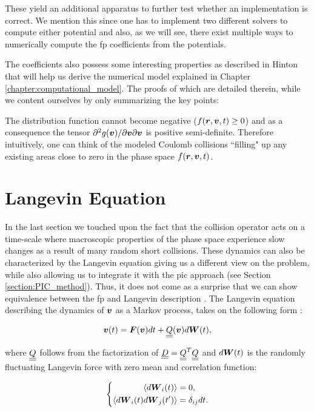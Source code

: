 These yield an additional apparatus to further test whether an implementation is correct. We mention
this since one has to implement two different solvers to compute either potential and also, as we will
see, there exist multiple ways to numerically compute the \gls{fp} coefficients from the potentials.

The coefficients also possess some interesting properties as described in Hinton
\cite{hinton1983collisional} that will help us derive the numerical model explained in Chapter
\ref{chapter:computational_model}. The proofs of which are detailed therein, while we content 
ourselves by only summarizing the key points:

The distribution function cannot become negative ($f(\boldsymbol{r}, \boldsymbol{v}, t) \ge 0$) and as a
consequence the tensor $\partial^2 g(\boldsymbol{v})/ \partial \boldsymbol{v} \partial \boldsymbol{v}$ is positive
semi-definite.
Therefore intuitively, one can think of the modeled Coulomb collisions ``filling" up any existing
areas close to zero in the phase space $f(\boldsymbol{r}, \boldsymbol{v}, t)$.


\section{Langevin Equation}
\label{section:langevin}

In the last section we touched upon the fact that the collision operator acts on a time-scale
where macroscopic properties of the phase space experience slow changes as a result of many random short
collisions.
These dynamics can also be characterized by the Langevin equation giving us a different view on the
problem, while also allowing us to integrate it with the \gls{pic} approach (see Section
\ref{section:PIC_method}).
Thus, it does not come as a surprise that we can show equivalence between the \gls{fp} and Langevin
description \cite{tabar2019}.
The Langevin equation describing the dynamics of $\boldsymbol{v}$ as a Markov process, takes on the
following form \cite{cadjan_ivanov_1999}:

\begin{equation}
    \boldsymbol{v}(t) = \boldsymbol{F}(\boldsymbol{v}) dt + \underline{\underline{Q}}(\boldsymbol{v})d\boldsymbol{W}(t),
    \label{eq:langevinEquation}
\end{equation}

where $\underline{\underline{Q}}$ follows from the factorization of $\underline{\underline{D}} = \underline{\underline{Q}}^T \underline{\underline{Q}}$ and $d\boldsymbol{W}(t)$ is
the randomly fluctuating Langevin force with zero mean and correlation function:

\begin{equation}
\label{eq:langevinForce}
\left\{  
\begin{aligned}
    \langle d \boldsymbol{W}_i(t) \rangle &= 0, \\
    \langle d \boldsymbol{W}_i(t) d \boldsymbol{W}_j(t') \rangle &= \delta_{ij} dt.
\end{aligned}
\right.
\end{equation}

